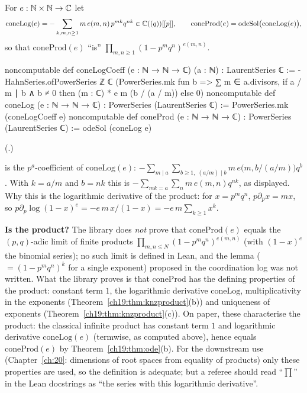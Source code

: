 \begin{definition}\label{ch19:def:coneprod}
For $e:{\mathbb{N}}\times{\mathbb{N}}\to{\mathbb{C}}$ let
\begin{equation*}
  \mathrm{coneLog}(e)=-\sum_{k,m,n\ge1}m\,e(m,n)\,p^{mk}q^{nk}\in{\mathbb{C}}((q))[[p]],\qquad
  \mathrm{coneProd}(e)=\mathrm{odeSol}\bigl(\mathrm{coneLog}(e)\bigr),
\end{equation*}
so that $\mathrm{coneProd}(e)$ ``is'' $\prod_{m,n\ge1}(1-p^mq^n)^{e(m,n)}$.
\end{definition}
\begin{leancode}
noncomputable def coneLogCoeff (e : ℕ → ℕ → ℂ) (a : ℕ) : LaurentSeries ℂ :=
  -HahnSeries.ofPowerSeries ℤ ℂ (PowerSeries.mk fun b =>
    ∑ m ∈ a.divisors, if a / m ∣ b ∧ b ≠ 0 then (m : ℂ) * e m (b / (a / m)) else 0)
noncomputable def coneLog (e : ℕ → ℕ → ℂ) : PowerSeries (LaurentSeries ℂ) :=
  PowerSeries.mk (coneLogCoeff e)
noncomputable def coneProd (e : ℕ → ℕ → ℂ) : PowerSeries (LaurentSeries ℂ) :=
  odeSol (coneLog e)
\end{leancode}
(.)
\begin{dictionary}
 is the $p^a$-coefficient of $\mathrm{coneLog}(e)$: $-\sum_{m\mid a}\sum_{b\ge1,\;(a/m)\mid b}m\,e\bigl(m,b/(a/m)\bigr)q^b$.
With $k=a/m$ and $b=nk$ this is $-\sum_{mk=a}\sum_nm\,e(m,n)q^{nk}$, as displayed.  Why this is the logarithmic derivative of
the product: for $x=p^mq^n$, $p\partial_px=mx$, so $p\partial_p\log(1-x)^{e}=-e\,m\,x/(1-x)=-e\,m\sum_{k\ge1}x^k$.

\textbf{Is  the product?}  The library does \emph{not} prove that $\mathrm{coneProd}(e)$ equals the
$(p,q)$-adic limit of finite products $\prod_{m,n\le N}(1-p^mq^n)^{e(m,n)}$ (with $(1-x)^e$ the binomial series); no such
limit is defined in Lean, and the lemma  ($=(1-p^mq^n)^k$ for a single exponent) proposed in the
coordination log was not written.  What the library proves is that $\mathrm{coneProd}$ has the defining properties of the
product: constant term $1$, the logarithmic derivative $\mathrm{coneLog}$, multiplicativity in the exponents
(Theorem~\ref{ch19:thm:knzproduct}(b)) and uniqueness of exponents (Theorem~\ref{ch19:thm:knzproduct}(c)).  On paper,
these characterise the product: the classical infinite product has constant term $1$ and logarithmic derivative
$\mathrm{coneLog}(e)$ (termwise, as computed above), hence equals $\mathrm{coneProd}(e)$ by Theorem~\ref{ch19:thm:ode}(b).
For the downstream use (Chapter~\ref{ch:20}: dimensions of root spaces from equality of products) only these properties
are used, so the definition is adequate; but a referee should read ``$\prod$'' in the Lean docstrings as
``the series with this logarithmic derivative''.
\end{dictionary}
